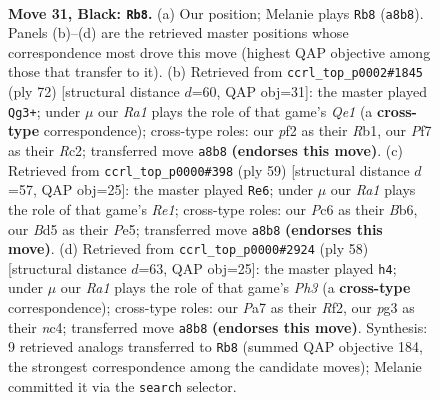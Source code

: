 \documentclass[11pt]{article}
\begin{document}
\clearpage

\begin{figure}[p]\centering
\begin{subfigure}{0.46\textwidth}\centering
\resizebox{\linewidth}{!}{%
\newchessgame
\chessboard[
  setfen={r2k2r1/p4p1p/1qp5/2Nb4/8/Q2P2P1/5P1P/2R3K1 b - - 2 31},
  showmover=false,
  pgfstyle=straightmove, color=movearrow, markmove={a8-b8}
]}
\caption{}
\end{subfigure}\hfill
\begin{subfigure}{0.46\textwidth}\centering
\resizebox{\linewidth}{!}{%
\newchessgame
\chessboard[
  setfen={1r1r4/6kp/pp6/3Bp2q/1PP2n2/8/2R4P/1R2Q2K w - - 4 37},
  showmover=false,
  pgfstyle=straightmove, color=movearrow, markmove={e1-g3}
]}
\caption{}
\end{subfigure}
\\[4pt]
\begin{subfigure}{0.46\textwidth}\centering
\resizebox{\linewidth}{!}{%
\newchessgame
\chessboard[
  setfen={4r1k1/2q2pp1/1bN5/4p2p/PQ6/2R3P1/5P1P/6K1 b - - 0 30},
  showmover=false,
  pgfstyle=straightmove, color=movearrow, markmove={e8-e6}
]}
\caption{}
\end{subfigure}\hfill
\begin{subfigure}{0.46\textwidth}\centering
\resizebox{\linewidth}{!}{%
\newchessgame
\chessboard[
  setfen={2k4r/3r1p2/1p2p2P/p1pq4/2n2BP1/7P/5RQ1/4R2K w - - 0 30},
  showmover=false,
  pgfstyle=straightmove, color=movearrow, markmove={h3-h4}
]}
\caption{}
\end{subfigure}
\caption{\textbf{Move 31, Black: \texttt{Rb8}.} (a) Our position; Melanie plays \texttt{Rb8} (\texttt{a8b8}). Panels (b)--(d) are the retrieved master positions whose correspondence most drove this move (highest QAP objective among those that transfer to it). (b) Retrieved from \texttt{ccrl\_top\_p0002\#1845} (ply 72) [structural distance $d$=60, QAP obj=31]: the master played \texttt{Qg3+}; under $\mu$ our \emph{Ra1} plays the role of that game's \emph{Qe1} (a \textbf{cross-type} correspondence); cross-type roles: our \emph{p}f2 as their \emph{R}b1, our \emph{P}f7 as their \emph{R}c2; transferred move \texttt{a8b8} \textbf{(endorses this move)}. (c) Retrieved from \texttt{ccrl\_top\_p0000\#398} (ply 59) [structural distance $d$=57, QAP obj=25]: the master played \texttt{Re6}; under $\mu$ our \emph{Ra1} plays the role of that game's \emph{Re1}; cross-type roles: our \emph{P}c6 as their \emph{B}b6, our \emph{B}d5 as their \emph{P}e5; transferred move \texttt{a8b8} \textbf{(endorses this move)}. (d) Retrieved from \texttt{ccrl\_top\_p0000\#2924} (ply 58) [structural distance $d$=63, QAP obj=25]: the master played \texttt{h4}; under $\mu$ our \emph{Ra1} plays the role of that game's \emph{Ph3} (a \textbf{cross-type} correspondence); cross-type roles: our \emph{P}a7 as their \emph{R}f2, our \emph{p}g3 as their \emph{n}c4; transferred move \texttt{a8b8} \textbf{(endorses this move)}. Synthesis: 9 retrieved analogs transferred to \texttt{Rb8} (summed QAP objective 184, the strongest correspondence among the candidate moves); Melanie committed it via the \texttt{search} selector.}
\label{fig:thought-m61}
\end{figure}
\end{document}
